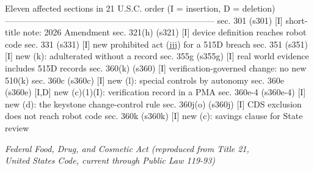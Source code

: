 \begin{asciifig}
Eleven affected sections in 21 U.S.C. order (I = insertion, D = deletion)
--------------------------------------------------------------------------
  sec. 301     (s301)     [I]   short-title note: 2026 Amendment
  sec. 321(h)  (s321)     [I]   device definition reaches robot code
  sec. 331     (s331)     [I]   new prohibited act (jjj) for a 515D breach
  sec. 351     (s351)     [I]   new (k): adulterated without a record
  sec. 355g    (s355g)    [I]   real world evidence includes 515D records
  sec. 360(k)  (s360)     [I]   verification-governed change: no new 510(k)
  sec. 360c    (s360c)    [I]   new (l): special controls by autonomy
  sec. 360e    (s360e)    [I,D] new (c)(1)(I): verification record in a PMA
  sec. 360e-4  (s360e-4)  [I]   new (d): the keystone change-control rule
  sec. 360j(o) (s360j)    [I]   CDS exclusion does not reach robot code
  sec. 360k    (s360k)    [I]   new (c): savings clause for State review
\end{asciifig}
\vspace{-0.5cm}

\clearpage

\begin{center}\small\itshape Federal Food, Drug, and Cosmetic Act (reproduced from
Title 21,\\United States Code, current through Public Law 119-93)\end{center}



\begin{center}\small *\quad *\quad *\quad *\quad *\quad *\quad *\end{center}




